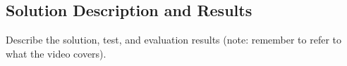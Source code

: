 \subsection{Solution Description and Results}
Describe the solution, test, and evaluation results (note: remember to refer to what the video covers).
